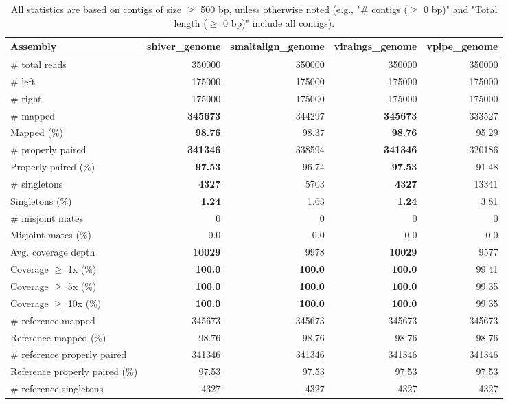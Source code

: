 \documentclass[12pt,a4paper]{article}
\begin{document}
\begin{table}[ht]
\begin{center}
\caption{All statistics are based on contigs of size $\geq$ 500 bp, unless otherwise noted (e.g., "\# contigs ($\geq$ 0 bp)" and "Total length ($\geq$ 0 bp)" include all contigs).}
\begin{tabular}{|l*{4}{|r}|}
\hline
Assembly & shiver\_genome & smaltalign\_genome & viralngs\_genome & vpipe\_genome \\ \hline
\# total reads & 350000 & 350000 & 350000 & 350000 \\ \hline
\# left & 175000 & 175000 & 175000 & 175000 \\ \hline
\# right & 175000 & 175000 & 175000 & 175000 \\ \hline
\# mapped & {\bf 345673} & 344297 & {\bf 345673} & 333527 \\ \hline
Mapped (\%) & {\bf 98.76} & 98.37 & {\bf 98.76} & 95.29 \\ \hline
\# properly paired & {\bf 341346} & 338594 & {\bf 341346} & 320186 \\ \hline
Properly paired (\%) & {\bf 97.53} & 96.74 & {\bf 97.53} & 91.48 \\ \hline
\# singletons & {\bf 4327} & 5703 & {\bf 4327} & 13341 \\ \hline
Singletons (\%) & {\bf 1.24} & 1.63 & {\bf 1.24} & 3.81 \\ \hline
\# misjoint mates & 0 & 0 & 0 & 0 \\ \hline
Misjoint mates (\%) & 0.0 & 0.0 & 0.0 & 0.0 \\ \hline
Avg. coverage depth & {\bf 10029} & 9978 & {\bf 10029} & 9577 \\ \hline
Coverage $\geq$ 1x (\%) & {\bf 100.0} & {\bf 100.0} & {\bf 100.0} & 99.41 \\ \hline
Coverage $\geq$ 5x (\%) & {\bf 100.0} & {\bf 100.0} & {\bf 100.0} & 99.35 \\ \hline
Coverage $\geq$ 10x (\%) & {\bf 100.0} & {\bf 100.0} & {\bf 100.0} & 99.35 \\ \hline
\# reference mapped & 345673 & 345673 & 345673 & 345673 \\ \hline
Reference mapped (\%) & 98.76 & 98.76 & 98.76 & 98.76 \\ \hline
\# reference properly paired & 341346 & 341346 & 341346 & 341346 \\ \hline
Reference properly paired (\%) & 97.53 & 97.53 & 97.53 & 97.53 \\ \hline
\# reference singletons & 4327 & 4327 & 4327 & 4327 \\ \hline

\end{tabular}
\end{center}
\end{table}
\end{document}
